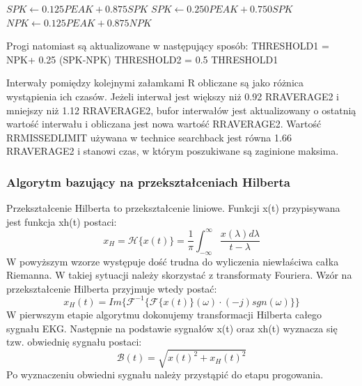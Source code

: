 \begin{enumerate}[I.]
\begin{algorithmic}
    \State $SPK \gets 0.125 PEAK + 0.875 SPK$
	\State $SPK \gets 0.250 PEAK + 0.750 SPK$
\Else 
	\State $NPK \gets 0.125 PEAK + 0.875 NPK$
\EndIf
\end{algorithmic}
Progi natomiast są aktualizowane w następujący sposób:
\newline
THRESHOLD1 = NPK+ 0.25 (SPK-NPK)
\newline
THRESHOLD2 = 0.5 THRESHOLD1

Interwały pomiędzy kolejnymi załamkami R obliczane są jako różnica wystąpienia ich czasów. Jeżeli interwał jest większy niż 0.92 RRAVERAGE2 i mniejszy niż 1.12 RRAVERAGE2, bufor interwałów jest aktualizowany o ostatnią wartość interwału i obliczana jest nowa wartość RRAVERAGE2. Wartość RRMISSEDLIMIT używana w technice searchback jest równa 1.66 RRAVERAGE2 i stanowi czas, w którym poszukiwane są zaginione maksima.
\end{enumerate}
\subsubsection{Algorytm bazujący na przekształceniach Hilberta}
Przekształcenie Hilberta to przekształcenie liniowe. Funkcji x(t) przypisywana jest funkcja xh(t) postaci:
\begin{equation}
x_H = \mathcal{H}\{x(t)\}=\frac{1}{\pi}\int_{-\infty}^\infty \frac{x(\lambda)d\lambda}{t-\lambda}
\end{equation}
W powyższym wzorze występuje dość trudna do wyliczenia niewłaściwa całka Riemanna. W takiej sytuacji należy skorzystać z transformaty Fouriera. Wzór na przekształcenie Hilberta przyjmuje wtedy postać:
\begin{equation}
x_H(t)=Im \{ \mathcal{F}^{-1} \{ \mathcal{F} \{ x(t) \}(\omega)\cdot (-j)sgn(\omega)\}  \}
\end{equation}
W pierwszym etapie algorytmu dokonujemy transformacji Hilberta całego sygnału EKG. Następnie na podstawie sygnałów x(t) oraz xh(t) wyznacza się tzw. obwiednię sygnału postaci:
\begin{equation}
\mathcal{B}(t)=\sqrt{x(t)^2+x_H(t)^2}
\end{equation}
Po wyznaczeniu obwiedni sygnału należy przystąpić do etapu progowania.

